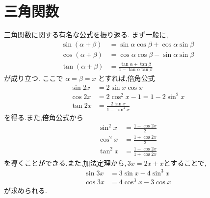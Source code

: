\section{三角関数}
  三角関数に関する有名な公式を振り返る.
  まず一般に,
  \begin{align*}
    \sin(\alpha+\beta)
      &=\sin\alpha\cos\beta+\cos\alpha\sin\beta\\
    \cos(\alpha+\beta)
      &=\cos\alpha\cos\beta-\sin\alpha\sin\beta\\
    \tan(\alpha+\beta)
      &=\frac{\tan\alpha+\tan\beta}
              {1-\tan\alpha\tan\beta}
  \end{align*}
  が成り立つ.
  ここで $\alpha=\beta=x$ とすれば,倍角公式
  \begin{align*}
    \sin 2x&=2\sin x\cos x\\
    \cos 2x&=2\cos^2x-1=1-2\sin^2x\\
    \tan 2x&=\frac{2\tan x}{1-\tan^2x}
  \end{align*}
  を得る.また,倍角公式から
  \begin{align*}
    \sin^2x&=\frac{1-\cos 2x}{2}\\
    \cos^2x&=\frac{1+\cos 2x}{2}\\
    \tan^2x&=\frac{1-\cos 2x}{1+\cos 2x}
  \end{align*}
  を導くことができる.また,加法定理から,\,$3x=2x+x$とすることで,
  \begin{align*}
    \sin 3x&=3\sin x-4\sin^3x\\
    \cos 3x&=4\cos^3x-3\cos x
  \end{align*}
  が求められる.